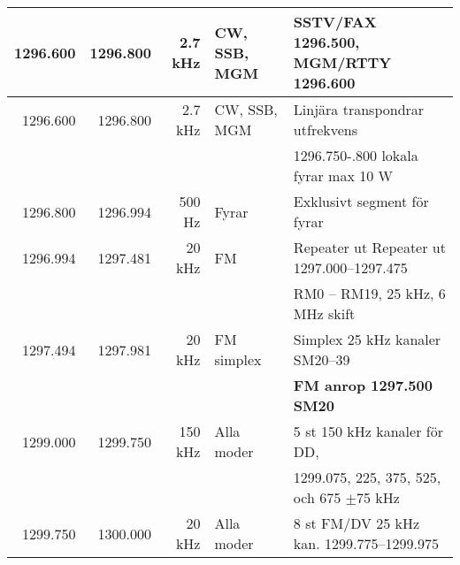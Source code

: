 \begin{tabular}{rrrll}
	1296.600         & 1296.800      & 2.7 kHz     & CW, SSB, MGM    & SSTV/FAX 1296.500, MGM/RTTY 1296.600                         \\ \hline
	1296.600         & 1296.800      & 2.7 kHz     & CW, SSB, MGM    & Linjära transpondrar utfrekvens                              \\
	&               &             &                 & 1296.750-.800 lokala fyrar max 10 W                          \\ \hline
	1296.800         & 1296.994      & 500 Hz      & Fyrar           & Exklusivt segment för fyrar                                  \\ \hline
	1296.994         & 1297.481      & 20 kHz      & FM              & Repeater ut Repeater ut 1297.000--1297.475                   \\
	&               &             &                 & RM0 – RM19, 25 kHz, 6 MHz skift                              \\ \hline
	1297.494         & 1297.981      & 20 kHz      & FM simplex      & Simplex 25 kHz kanaler SM20--39                              \\
	&               &             &                 & \textbf{FM anrop 1297.500 SM20}                              \\ \hline
	1299.000         & 1299.750      & 150 kHz     & Alla moder      & 5 st 150 kHz kanaler för DD,                                 \\
	&               &             &                 & 1299.075, 225, 375, 525, och 675 $\pm$75 kHz                 \\ \hline
	1299.750         & 1300.000      & 20 kHz      & Alla moder      & 8 st FM/DV 25 kHz kan. 1299.775--1299.975
\end{tabular}

\clearpage



\twocolumn
